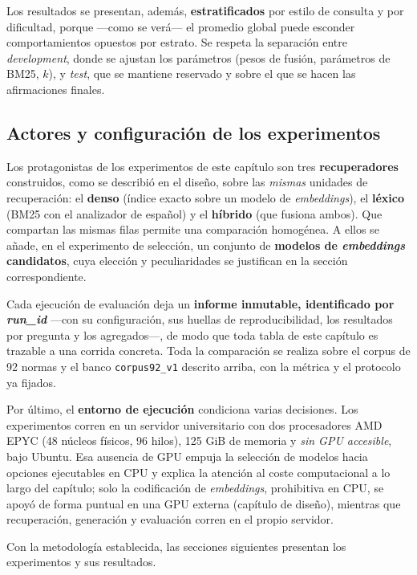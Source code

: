Los resultados se presentan, además, \textbf{estratificados} por estilo de consulta y por dificultad, porque —como se verá— el promedio global puede esconder comportamientos opuestos por estrato. Se respeta la separación entre \emph{development}, donde se ajustan los parámetros (pesos de fusión, parámetros de BM25, $k$), y \emph{test}, que se mantiene reservado y sobre el que se hacen las afirmaciones finales.

\subsection{Actores y configuración de los experimentos}
\label{subsec:actores}

Los protagonistas de los experimentos de este capítulo son tres \textbf{recuperadores} construidos, como se describió en el diseño, sobre las \emph{mismas} unidades de recuperación: el \textbf{denso} (índice exacto sobre un modelo de \emph{embeddings}), el \textbf{léxico} (BM25 con el analizador de español) y el \textbf{híbrido} (que fusiona ambos). Que compartan las mismas filas permite una comparación homogénea. A ellos se añade, en el experimento de selección, un conjunto de \textbf{modelos de \emph{embeddings} candidatos}, cuya elección y peculiaridades se justifican en la sección correspondiente.

Cada ejecución de evaluación deja un \textbf{informe inmutable, identificado por \emph{run\_id}} —con su configuración, sus huellas de reproducibilidad, los resultados por pregunta y los agregados—, de modo que toda tabla de este capítulo es trazable a una corrida concreta. Toda la comparación se realiza sobre el corpus de 92 normas y el banco \texttt{corpus92\_v1} descrito arriba, con la métrica y el protocolo ya fijados.

Por último, el \textbf{entorno de ejecución} condiciona varias decisiones. Los experimentos corren en un servidor universitario con dos procesadores AMD EPYC (48 núcleos físicos, 96 hilos), 125 GiB de memoria y \emph{sin GPU accesible}, bajo Ubuntu. Esa ausencia de GPU empuja la selección de modelos hacia opciones ejecutables en CPU y explica la atención al coste computacional a lo largo del capítulo; solo la codificación de \emph{embeddings}, prohibitiva en CPU, se apoyó de forma puntual en una GPU externa (capítulo de diseño), mientras que recuperación, generación y evaluación corren en el propio servidor.

Con la metodología establecida, las secciones siguientes presentan los experimentos y sus resultados.

